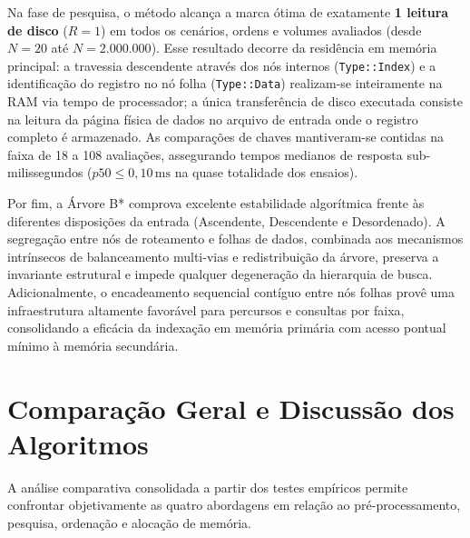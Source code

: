 \documentclass[12pt,a4paper]{article}
\begin{document}
Na fase de pesquisa, o método alcança a marca ótima de exatamente \textbf{1 leitura de disco} ($R = 1$) em todos os cenários, ordens e volumes avaliados (desde $N=20$ até $N=2.000.000$). Esse resultado decorre da residência em memória principal: a travessia descendente através dos nós internos (\texttt{Type::Index}) e a identificação do registro no nó folha (\texttt{Type::Data}) realizam-se inteiramente na RAM via tempo de processador; a única transferência de disco executada consiste na leitura da página física de dados no arquivo de entrada onde o registro completo é armazenado. As comparações de chaves mantiveram-se contidas na faixa de 18 a 108 avaliações, assegurando tempos medianos de resposta sub-milissegundos ($p50 \le 0{,}10\,\text{ms}$ na quase totalidade dos ensaios).

Por fim, a Árvore B* comprova excelente estabilidade algorítmica frente às diferentes disposições da entrada (Ascendente, Descendente e Desordenado). A segregação entre nós de roteamento e folhas de dados, combinada aos mecanismos intrínsecos de balanceamento multi-vias e redistribuição da árvore, preserva a invariante estrutural e impede qualquer degeneração da hierarquia de busca. Adicionalmente, o encadeamento sequencial contíguo entre nós folhas provê uma infraestrutura altamente favorável para percursos e consultas por faixa, consolidando a eficácia da indexação em memória primária com acesso pontual mínimo à memória secundária.

\section{Comparação Geral e Discussão dos Algoritmos}
\label{sec:comparacao}

A análise comparativa consolidada a partir dos testes empíricos permite confrontar objetivamente as quatro abordagens em relação ao pré-processamento, pesquisa, ordenação e alocação de memória.
\end{document}
